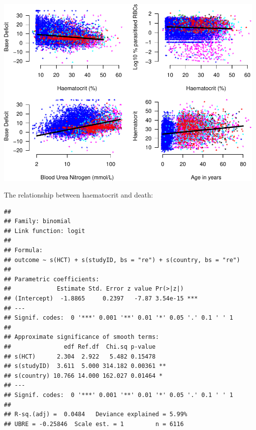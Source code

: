 \documentclass[]{article}
\newenvironment{Shaded}{\begin{snugshade}}{\end{snugshade}}
\newcommand{\KeywordTok}[1]{\textcolor[rgb]{0.13,0.29,0.53}{\textbf{#1}}}
\newcommand{\DataTypeTok}[1]{\textcolor[rgb]{0.13,0.29,0.53}{#1}}
\newcommand{\DecValTok}[1]{\textcolor[rgb]{0.00,0.00,0.81}{#1}}
\newcommand{\StringTok}[1]{\textcolor[rgb]{0.31,0.60,0.02}{#1}}
\newcommand{\OperatorTok}[1]{\textcolor[rgb]{0.81,0.36,0.00}{\textbf{#1}}}
\newcommand{\NormalTok}[1]{#1}
\begin{document}
\includegraphics{LegacyAnalysis_files/figure-latex/ExploratoryPlots-1.pdf}

The relationship between haematocrit and death:

\begin{Shaded}
\end{Shaded}

\begin{verbatim}
## 
## Family: binomial 
## Link function: logit 
## 
## Formula:
## outcome ~ s(HCT) + s(studyID, bs = "re") + s(country, bs = "re")
## 
## Parametric coefficients:
##             Estimate Std. Error z value Pr(>|z|)    
## (Intercept)  -1.8865     0.2397   -7.87 3.54e-15 ***
## ---
## Signif. codes:  0 '***' 0.001 '**' 0.01 '*' 0.05 '.' 0.1 ' ' 1
## 
## Approximate significance of smooth terms:
##               edf Ref.df  Chi.sq p-value   
## s(HCT)      2.304  2.922   5.482 0.15478   
## s(studyID)  3.611  5.000 314.182 0.00361 **
## s(country) 10.766 14.000 162.027 0.01464 * 
## ---
## Signif. codes:  0 '***' 0.001 '**' 0.01 '*' 0.05 '.' 0.1 ' ' 1
## 
## R-sq.(adj) =  0.0484   Deviance explained = 5.99%
## UBRE = -0.25846  Scale est. = 1         n = 6116
\end{verbatim}
\end{document}
